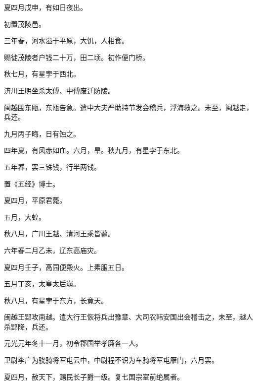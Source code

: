 \documentclass[12pt,UTF8]{ctexbook}
\begin{document}
夏四月戊申，有如日夜出。



初置茂陵邑。



三年春，河水溢于平原，大饥，人相食。



赐徙茂陵者户钱二十万，田二顷。初作便门桥。



秋七月，有星孛于西北。



济川王明坐杀太傅、中傅废迁防陵。



闽越围东瓯，东瓯告急。遣中大夫严助持节发会稽兵，浮海救之。未至，闽越走，兵还。



九月丙子晦，日有蚀之。



四年夏，有风赤如血。六月，旱。秋九月，有星孛于东北。



五年春，罢三铢钱，行半两钱。



置《五经》博士。



夏四月，平原君薨。



五月，大蝗。



秋八月，广川王越、清河王乘皆薨。



六年春二月乙未，辽东高庙灾。



夏四月壬子，高园便殿火。上素服五日。



五月丁亥，太皇太后崩。



秋八月，有星孛于东方，长竟天。



闽越王郢攻南越。遣大行王恢将兵出豫章、大司农韩安国出会稽击之，未至，越人杀郢降，兵还。



元光元年冬十一月，初令郡国举孝廉各一人。



卫尉李广为骁骑将军屯云中，中尉程不识为车骑将军屯雁门，六月罢。



夏四月，赦天下，赐民长子爵一级。复七国宗室前绝属者。
\end{document}
